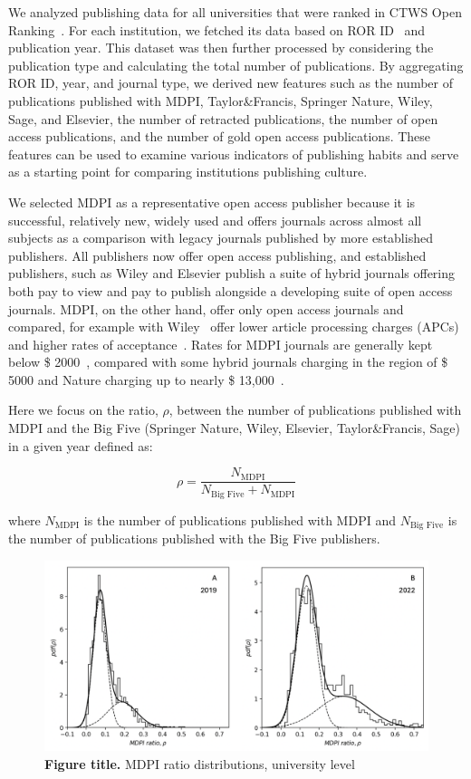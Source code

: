\documentclass[amsfonts, amssymb, prl, superscriptaddress, notitlepage, twocolumn, nofootinbib]{revtex4-2}
\begin{document}
We analyzed publishing data for all universities that were ranked in CTWS Open Ranking~\cite{cwts2024leiden}. For each institution, we fetched its data based on ROR ID~\cite{ROR} and publication year. This dataset was then further processed by considering the publication type and calculating the total number of publications. By aggregating ROR ID, year, and journal type, we derived new features such as the number of publications published with MDPI, Taylor\&Francis, Springer Nature, Wiley, Sage, and Elsevier, the number of retracted publications, the number of open access publications, and the number of gold open access publications. These features can be used to examine various indicators of publishing habits and serve as a starting point for comparing institutions publishing culture. 

We selected MDPI as a representative open access publisher because it is successful, relatively new, widely used and offers journals across almost all subjects as a comparison with legacy journals published by more established publishers. All publishers now offer open access publishing, and established publishers, such as Wiley and Elsevier publish a suite of hybrid journals offering both pay to view and pay to publish alongside a developing suite of open access journals. MDPI, on the other hand, offer only open access journals and compared, for example with Wiley~\cite{wiley} offer lower article processing charges (APCs) and higher rates of acceptance~\cite{fillon2024should}. Rates for MDPI journals are generally kept below \$ 2000~\cite{mdpi_apc}, compared with some hybrid journals charging in the region of \$ 5000 and Nature charging up to nearly \$ 13,000~\cite{nature_publishing_options}.

Here we focus on the ratio, $\rho$, between the number of publications published with MDPI and the Big Five (Springer Nature, Wiley, Elsevier, Taylor\&Francis, Sage) in a given year defined as: 

\begin{equation}
\rho = \frac{N_{\text{MDPI}}}{N_{\text{Big Five}}+N_{\text{MDPI}}}
\end{equation}

where $N_{\text{MDPI}}$ is the number of publications published with MDPI and $N_{\text{Big Five}}$ is the number of publications published with the Big Five publishers.

\begin{figure}
\centering
\includegraphics[width=1.0\linewidth]{Fig01.png}
\caption{\label{fig:fig1} {\bf Figure title.} MDPI ratio distributions, university level  
}
\end{figure}
\end{document}
